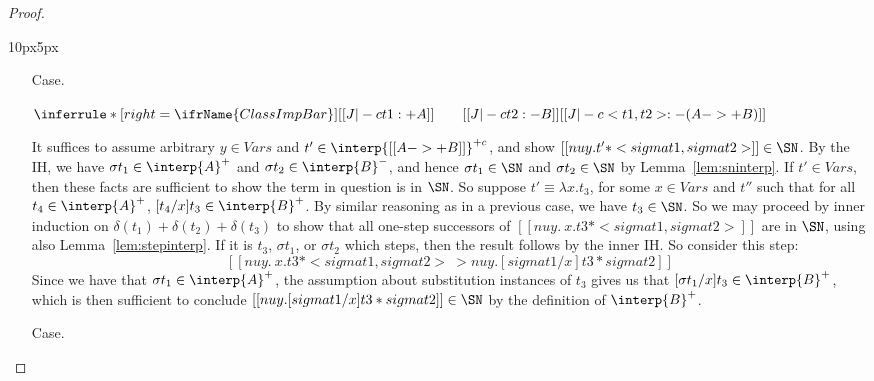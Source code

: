 \begin{proof}
\begin{changemargin}{10px}{5px}
\begin{itemize}
\item[Case.]\ 

\vspace{-.2cm}
\begin{center}
\begin{math}
\inferrule* [right=\ifrName{ClassImpBar}] {[[J |-c t1 : + A]]  \qquad [[ J |-c t2 : - B ]]}{[[ J |-c < t1 , t2 > : - (A ->+ B) ]]}
\end{math}
\end{center}
It suffices to assume arbitrary $y\in\textit{Vars}$ and
$t'\in\interp{[[A ->+ B]]}^{+c}$, and show $[[nu y. t' * < sigma t1 ,
sigma t2 >]]\in\SN$.  By the IH, we have $\sigma t_1\in\interp{A}^+$
and $\sigma t_2\in\interp{B}^-$, and hence $\sigma t_1\in\SN$ and
$\sigma t_2\in\SN$ by Lemma~\ref{lem:sninterp}.  If
$t'\in\textit{Vars}$, then these facts are sufficient to show the term
in question is in $\SN$.  So suppose $t'\equiv \lambda x.t_3$, for
some $x\in\textit{Vars}$ and $t''$ such that for all
$t_4\in\interp{A}^+$, $[t_4/x]t_3\in\interp{B}^+$.  By similar
reasoning as in a previous case, we have $t_3\in\SN$.  So we may
proceed by inner induction on $\delta(t_1)+\delta(t_2)+\delta(t_3)$ to
show that all one-step successors of $[[nu y. \ x . t3 * < sigma t1 ,
sigma t2 >]]$ are in $\SN$, using also Lemma~\ref{lem:stepinterp}.  If
it is $t_3$, $\sigma t_1$, or $\sigma t_2$ which steps, then the
result follows by the inner IH.  So consider this step:
\[
[[nu y. \ x . t3 * < sigma t1 , sigma t2 >  ~>  nu y . [sigma t1 / x] t3 * sigma t2]]
\]
Since we have that $\sigma t_1\in\interp{A}^+$, the assumption about substitution
instances of $t_3$ gives us that $[\sigma t_1/x]t_3\in\interp{B}^+$, which is
then sufficient to conclude $[[nu y . [sigma t1 / x] t3 * sigma t2]]\in\SN$
by the definition of $\interp{B}^+$.

\item[Case.]\ 


\end{itemize}
\end{changemargin}
\end{proof}
